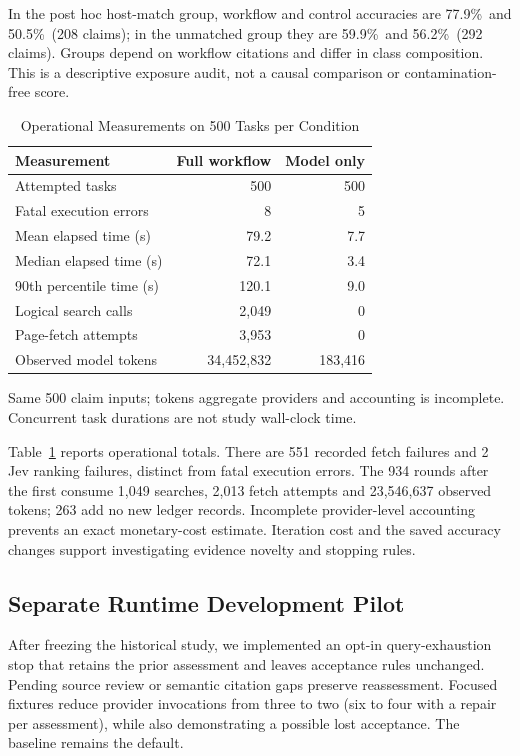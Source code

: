 \documentclass[conference]{IEEEtran}
\newcommand{\pct}{\%}
\begin{document}
In the post hoc host-match group, workflow and control accuracies are 77.9\pct\ and 50.5\pct\ (208 claims); in the unmatched group they are 59.9\pct\ and 56.2\pct\ (292 claims). Groups depend on workflow citations and differ in class composition. This is a descriptive exposure audit, not a causal comparison or contamination-free score.

\begin{table}[t]
\caption{Operational Measurements on 500 Tasks per Condition}
\label{tab:cost}
\centering
\footnotesize
\begin{tabular}{@{}lrr@{}}
\toprule
Measurement & Full workflow & Model only\\
\midrule
Attempted tasks & 500 & 500\\
Fatal execution errors & 8 & 5\\
Mean elapsed time (s) & 79.2 & 7.7\\
Median elapsed time (s) & 72.1 & 3.4\\
90th percentile time (s) & 120.1 & 9.0\\
Logical search calls & 2,049 & 0\\
Page-fetch attempts & 3,953 & 0\\
Observed model tokens & 34,452,832 & 183,416\\
\bottomrule
\end{tabular}
\par\smallskip
\parbox{\columnwidth}{\footnotesize Same 500 claim inputs; tokens aggregate providers and accounting is incomplete. Concurrent task durations are not study wall-clock time.}
\end{table}

Table~\ref{tab:cost} reports operational totals. There are 551 recorded fetch failures and 2 Jev ranking failures, distinct from fatal execution errors. The 934 rounds after the first consume 1,049 searches, 2,013 fetch attempts and 23,546,637 observed tokens; 263 add no new ledger records. Incomplete provider-level accounting prevents an exact monetary-cost estimate. Iteration cost and the saved accuracy changes support investigating evidence novelty and stopping rules.

\subsection{Separate Runtime Development Pilot}
After freezing the historical study, we implemented an opt-in query-exhaustion stop that retains the prior assessment and leaves acceptance rules unchanged. Pending source review or semantic citation gaps preserve reassessment. Focused fixtures reduce provider invocations from three to two (six to four with a repair per assessment), while also demonstrating a possible lost acceptance. The baseline remains the default.
\end{document}
